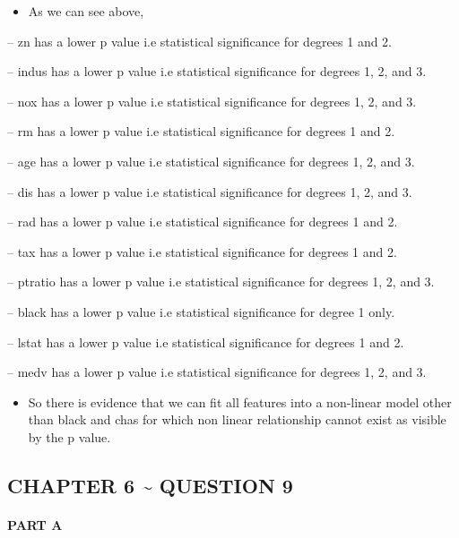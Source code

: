 \documentclass[
]{article}
\providecommand{\tightlist}{%
  \setlength{\itemsep}{0pt}\setlength{\parskip}{0pt}}
\begin{document}
\begin{itemize}
\tightlist
\item
  As we can see above,
\end{itemize}

-- zn has a lower p value i.e statistical significance for degrees 1 and
2.

-- indus has a lower p value i.e statistical significance for degrees 1,
2, and 3.

-- nox has a lower p value i.e statistical significance for degrees 1,
2, and 3.

-- rm has a lower p value i.e statistical significance for degrees 1 and
2.

-- age has a lower p value i.e statistical significance for degrees 1,
2, and 3.

-- dis has a lower p value i.e statistical significance for degrees 1,
2, and 3.

-- rad has a lower p value i.e statistical significance for degrees 1
and 2.

-- tax has a lower p value i.e statistical significance for degrees 1
and 2.

-- ptratio has a lower p value i.e statistical significance for degrees
1, 2, and 3.

-- black has a lower p value i.e statistical significance for degree 1
only.

-- lstat has a lower p value i.e statistical significance for degrees 1
and 2.

-- medv has a lower p value i.e statistical significance for degrees 1,
2, and 3.

\begin{itemize}
\tightlist
\item
  So there is evidence that we can fit all features into a non-linear
  model other than black and chas for which non linear relationship
  cannot exist as visible by the p value.
\end{itemize}

\hypertarget{chapter-6-question-9}{%
\subsection{CHAPTER 6 \textasciitilde{} QUESTION
9}\label{chapter-6-question-9}}

\hypertarget{part-a-2}{%
\paragraph{PART A}\label{part-a-2}}
\end{document}
